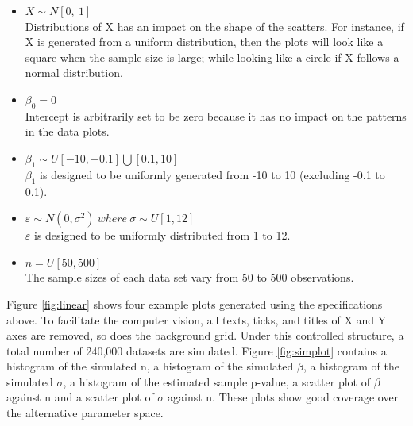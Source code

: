 \documentclass[12pt]{article}
\begin{document}
\begin{itemize}
\item
  \(X \sim N[0,\ 1]\)\\
  Distributions of X has an impact on the shape of the scatters. For
  instance, if X is generated from a uniform distribution, then the
  plots will look like a square when the sample size is large; while
  looking like a circle if X follows a normal distribution.
\item
  \(\beta_0 = 0\)\\
  Intercept is arbitrarily set to be zero because it has no impact on
  the patterns in the data plots.
\item
  \(\beta_1\sim U[-10, -0.1] \bigcup [0.1, 10]\)\\
  \(\beta_1\) is designed to be uniformly generated from -10 to 10
  (excluding -0.1 to 0.1).
\item
  \(\varepsilon\sim N(0, \sigma^2) \ where\ \sigma \sim U[1,12]\)\\
  \(\varepsilon\) is designed to be uniformly distributed from 1 to 12.
\item
  \(n=U[50,500]\)\\
  The sample sizes of each data set vary from 50 to 500 observations.
\end{itemize}

Figure \ref{fig:linear} shows four example plots generated using the
specifications above. To facilitate the computer vision, all texts,
ticks, and titles of X and Y axes are removed, so does the background
grid. Under this controlled structure, a total number of 240,000
datasets are simulated. Figure \ref{fig:simplot} contains a histogram of
the simulated n, a histogram of the simulated \(\beta\), a histogram of
the simulated \(\sigma\), a histogram of the estimated sample p-value, a
scatter plot of \(\beta\) against n and a scatter plot of \(\sigma\)
against n. These plots show good coverage over the alternative parameter
space.
\end{document}

